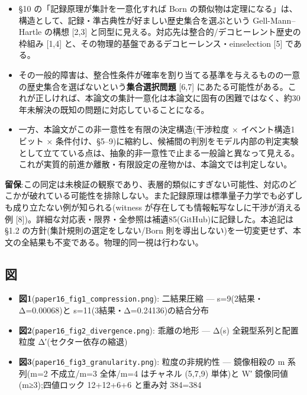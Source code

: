 \documentclass[
]{ltjsarticle}
\providecommand{\tightlist}{%
  \setlength{\itemsep}{0pt}\setlength{\parskip}{0pt}}
\begin{document}
\begin{itemize}
\tightlist
\item
  §10 の「記録原理が集計を一意化すれば Born
  の類似物は定理になる」は、構造として、記録・準古典性が好ましい歴史集合を選ぶという
  Gell-Mann--Hartle の構想 {[}2,3{]}
  と同型に見える。対応先は整合的/デコヒーレント歴史の枠組み {[}1,4{]}
  と、その物理的基盤であるデコヒーレンス・einselection {[}5{]} である。
\item
  その一般的障害は、整合性条件が確率を割り当てる基準を与えるものの一意の歴史集合を選ばないという\textbf{集合選択問題}
  {[}6,7{]}
  にあたる可能性がある。これが正しければ、本論文の集計一意化は本論文に固有の困難ではなく、約30年未解決の既知の問題に対応していることになる。
\item
  一方、本論文がこの非一意性を有限の決定構造(干渉粒度 ×
  イベント構造1ビット ×
  条件付け、§5--9)に縮約し、候補間の判別をモデル内部の判定実験として立てている点は、抽象的非一意性で止まる一般論と異なって見える。これが実質的前進か離散・有限設定の産物かは、本論文では判定しない。
\end{itemize}

\textbf{留保}:この同定は未検証の観察であり、表層的類似にすぎない可能性、対応のどこかが破れている可能性を排除しない。また記録原理は標準量子力学でも必ずしも成り立たない例が知られる(witness
が存在しても情報転写なしに干渉が消える例
{[}8{]})。詳細な対応表・限界・全参照は補遺85(GitHub)に記録した。本追記は
§1.2 の方針(集計規則の選定をしない/Born
則を導出しない)を一切変更せず、本文の全結果も不変である。物理的同一視は行わない。

\subsection{図}\label{ux56f3}

\begin{itemize}
\tightlist
\item
  \textbf{図1}(\texttt{paper16\_fig1\_compression.png}): 二結果圧縮 ---
  s=9(2結果・Δ=0.00068)と s=11(3結果・Δ=0.24136)の結合分布
\item
  \textbf{図2}(\texttt{paper16\_fig2\_divergence.png}): 乖離の地形 ---
  Δ(s) 全親型系列と配置粒度 Δ′(セクター依存の縮退)
\item
  \textbf{図3}(\texttt{paper16\_fig3\_granularity.png}): 粒度の非規約性
  --- 鏡像相殺の m 系列(m=2 不成立/m=3 全体/m=4 はチャネル (5,7,9)
  単体)と W′ 鏡像同値(m≥3);四値ロック 12+12+6+6 と重み対 384=384
\end{itemize}
\end{document}

